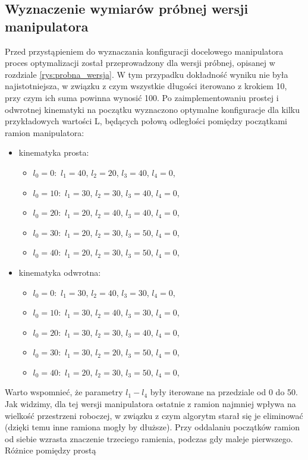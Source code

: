 \documentclass[printmode]{mgr}
\begin{document}
\subsection{Wyznaczenie wymiarów próbnej wersji manipulatora}\label{sec:wymiary_probnej_wersji}
Przed przystąpieniem do wyznaczania konfiguracji docelowego manipulatora proces optymalizacji został przeprowadzony dla wersji próbnej,
opisanej w rozdziale \ref{rys:probna_wersja}. W tym przypadku dokładność wyniku nie była najistotniejsza, w związku z czym
wszystkie długości iterowano z krokiem 10, przy czym ich suma powinna wynosić 100. 
Po zaimplementowaniu prostej i odwrotnej kinematyki na początku wyznaczono optymalne
konfiguracje dla kilku przykładowych wartości L, będących połową odległości pomiędzy początkami ramion manipulatora:
\begin{itemize}
\item kinematyka prosta:
\begin{itemize}
\item $l_0=0:$ $l_1=40$, $l_2=20$, $l_3=40$, $l_4=0$,
\item $l_0=10:$ $l_1=30$, $l_2=30$, $l_3=40$, $l_4=0$,
\item $l_0=20:$ $l_1=20$, $l_2=40$, $l_3=40$, $l_4=0$,
\item $l_0=30:$ $l_1=20$, $l_2=30$, $l_3=50$, $l_4=0$,
\item $l_0=40:$ $l_1=20$, $l_2=30$, $l_3=50$, $l_4=0$,
\end{itemize}
\item kinematyka odwrotna:
\begin{itemize}
\item $l_0=0:$ $l_1=30$, $l_2=40$, $l_3=30$, $l_4=0$,
\item $l_0=10:$ $l_1=30$, $l_2=40$, $l_3=30$, $l_4=0$,
\item $l_0=20:$ $l_1=30$, $l_2=30$, $l_3=40$, $l_4=0$,
\item $l_0=30:$ $l_1=30$, $l_2=20$, $l_3=50$, $l_4=0$,
\item $l_0=40:$ $l_1=20$, $l_2=30$, $l_3=50$, $l_4=0$,
\end{itemize}
\end{itemize}
Warto wspomnieć, że parametry $l_1-l_4$ były iterowane na przedziale od 0 do 50. Jak widzimy, dla tej wersji manipulatora ostatnie z ramion
najmniej wpływa na wielkość przestrzeni roboczej, w związku z czym algorytm starał się je eliminować (dzięki temu inne ramiona mogły by dłuższe).
Przy oddalaniu początków ramion od siebie wzrasta znaczenie trzeciego ramienia, podczas gdy maleje pierwszego. Różnice pomiędzy prostą
\end{document}
